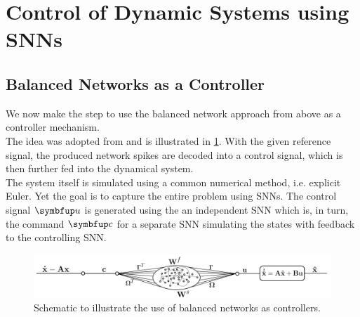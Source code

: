 \section{Control of Dynamic Systems using SNNs}\label{sec:control}
\subsection{Balanced Networks as a Controller}
We now make the step to use the balanced network approach from above as a controller mechanism.\\
The idea was adopted from \cite{huang_optimizing_2017} and is illustrated in \cref{fig:schematic}. With the given reference signal, the produced network spikes are decoded into a control signal, which is then further fed into the dynamical system.\\
The system itself is simulated using a common numerical method, i.e. explicit Euler. Yet the goal is to capture the entire problem using \acp{SNN}. The control signal $\bmu{u}$ is generated using the an independent \ac{SNN} which is, in turn, the command $\bmu{c}$ for a separate \ac{SNN} simulating the states with feedback to the controlling \ac{SNN}.
\begin{figure}
	\centering
	\includegraphics[width=\textwidth]{svg-inkscape/schematic_controller_network.pdf}
	\caption{Schematic to illustrate the use of balanced networks as controllers.}
	\label{fig:schematic}
\end{figure}
